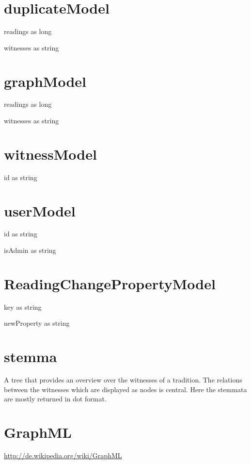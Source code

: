 \section{duplicateModel}
\begin{property}
readings as long
\end{property}
\begin{property}
witnesses as string
\end{property}
\section{graphModel}
\begin{property}
readings as long
\end{property}
\begin{property}
witnesses as string
\end{property}
\section{witnessModel}
\begin{property}
id as string
\end{property}
\section{userModel}
\begin{property}
id as string
\end{property}
\begin{property}
isAdmin as string
\end{property}
\section{ReadingChangePropertyModel}
\begin{property}
key as string
\end{property}
\begin{property}
newProperty as string
\end{property}
\section{stemma}
A tree that provides an overview over the witnesses of a tradition. The relations between the witnesses which are displayed as nodes is central. Here the stemmata are mostly returned in dot format.
\section{GraphML}
\url{http://de.wikipedia.org/wiki/GraphML}
